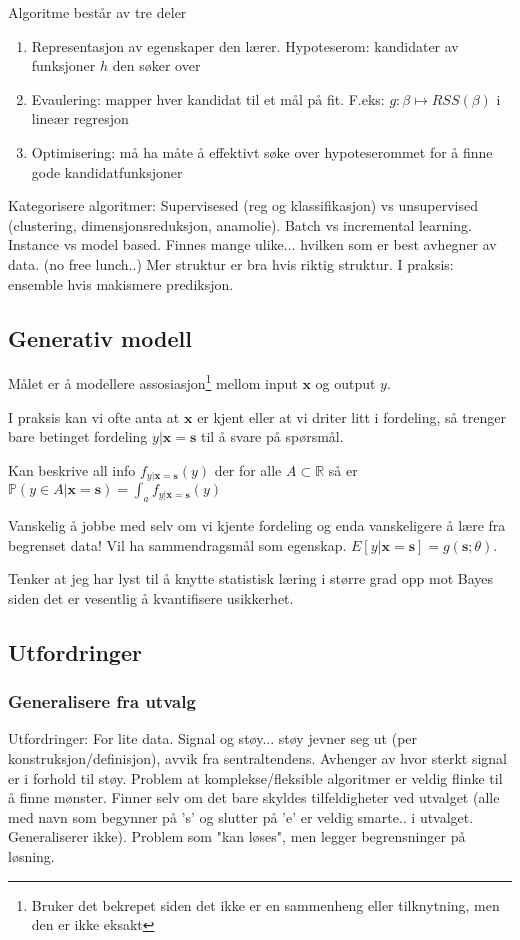 Algoritme består av tre deler
\begin{enumerate}
\item Representasjon av egenskaper den lærer. Hypoteserom: kandidater av funksjoner $h$ den søker over
\item Evaulering: mapper hver kandidat til et mål på fit. F.eks: $g:\beta \mapsto RSS(\beta)$ i lineær regresjon
\item Optimisering: må ha måte å effektivt søke over hypoteserommet for å finne gode kandidatfunksjoner
\end{enumerate}
Kategorisere algoritmer: Supervisesed (reg og klassifikasjon) vs unsupervised (clustering, dimensjonsreduksjon, anamolie). Batch vs incremental learning. Instance vs model based.  Finnes mange ulike... hvilken som er best avhegner av data. (no free lunch..) Mer struktur er bra hvis riktig struktur. I praksis: ensemble hvis makismere prediksjon.
\subsection{Generativ modell}
Målet er å modellere assosiasjon\footnote{Bruker det bekrepet siden det ikke er en sammenheng eller tilknytning, men den er ikke eksakt} mellom input $\mathbf{x}$ og output $y$.

I praksis kan vi ofte anta at $\mathbf{x}$ er kjent eller at vi driter litt i fordeling, så trenger bare betinget fordeling $y|\mathbf{x}=\mathbf{s}$ til å svare på spørsmål.

Kan beskrive all info $f_{y|\mathbf{x}=\mathbf{s}}(y)$ der for alle $A \subset \mathbb{R}$ så er $\mathbb{P}(y\in A|\mathbf{x}=\mathbf{s})=\int_a f_{y|\mathbf{x}=\mathbf{s}}(y)$

Vanskelig å jobbe med selv om vi kjente fordeling og enda vanskeligere å lære fra begrenset data! Vil ha sammendragsmål som egenskap. $E[y|\mathbf{x}=\mathbf{s}] = g(\mathbf{s};\theta)$. 

Tenker at jeg har lyst til å knytte statistisk læring i større grad opp mot Bayes siden det er vesentlig å kvantifisere usikkerhet.
\subsection{Utfordringer}
\subsubsection{Generalisere fra utvalg}
Utfordringer: For lite data. Signal og støy... støy jevner seg ut (per konstruksjon/definisjon), avvik fra sentraltendens. Avhenger av hvor sterkt signal er i forhold til støy. Problem at komplekse/fleksible algoritmer er veldig flinke til å finne mønster. Finner selv om det bare skyldes tilfeldigheter ved utvalget (alle med navn som begynner på 's' og slutter på 'e' er veldig smarte.. i utvalget. Generaliserer ikke). Problem som "kan løses", men legger begrensninger på løsning.

